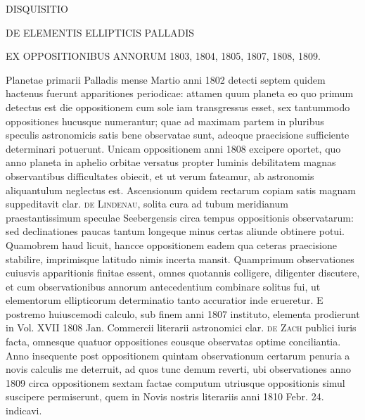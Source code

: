 \begin{center}
{\large DISQUISITIO}\par\medskip
{\Large DE ELEMENTIS ELLIPTICIS PALLADIS}\par\medskip
EX OPPOSITIONIBUS ANNORUM 1803, 1804, 1805, 1807, 1808, 1809.
\end{center}
Planetae primarii Palladis mense Martio anni 1802 detecti septem quidem hactenus fuerunt apparitiones periodicae: attamen quum planeta eo quo primum detectus est die oppositionem cum sole iam transgressus esset, sex tantummodo oppositiones hucusque numerantur; quae ad maximam partem in pluribus speculis astronomicis satis bene observatae sunt, adeoque praecisione sufficiente determinari potuerunt. Unicam oppositionem anni 1808 excipere oportet, quo anno planeta in aphelio orbitae versatus propter luminis debilitatem magnas observantibus difficultates obiecit, et ut verum fateamur, ab astronomis aliquantulum neglectus est. Ascensionum quidem rectarum copiam satis magnam suppeditavit clar. \textsc{de Lindenau}, solita cura ad tubum meridianum praestantissimum speculae Seebergensis circa tempus oppositionis observatarum: sed declinationes paucas tantum longeque minus certas aliunde obtinere potui. Quamobrem haud licuit, hancce oppositionem eadem qua ceteras praecisione stabilire, imprimisque latitudo nimis incerta mansit.
Quamprimum observationes cuiusvis apparitionis finitae essent, omnes quotannis colligere, diligenter discutere, et cum observationibus annorum antecedentium combinare solitus fui, ut elementorum ellipticorum determinatio tanto accuratior inde erueretur. E postremo huiuscemodi calculo, sub finem anni 1807 instituto, elementa prodierunt in Vol. XVII 1808 Jan. Commercii literarii astronomici clar. \textsc{de Zach} publici iuris facta, omnesque quatuor oppositiones eousque observatas optime conciliantia. Anno insequente post oppositionem quintam observationum certarum penuria a novis calculis me deterruit, ad quos tunc demum reverti, ubi observationes anno 1809 circa oppositionem sextam factae computum utriusque oppositionis simul suscipere permiserunt, quem in Novis nostris literariis anni 1810 Febr. 24. indicavi.

